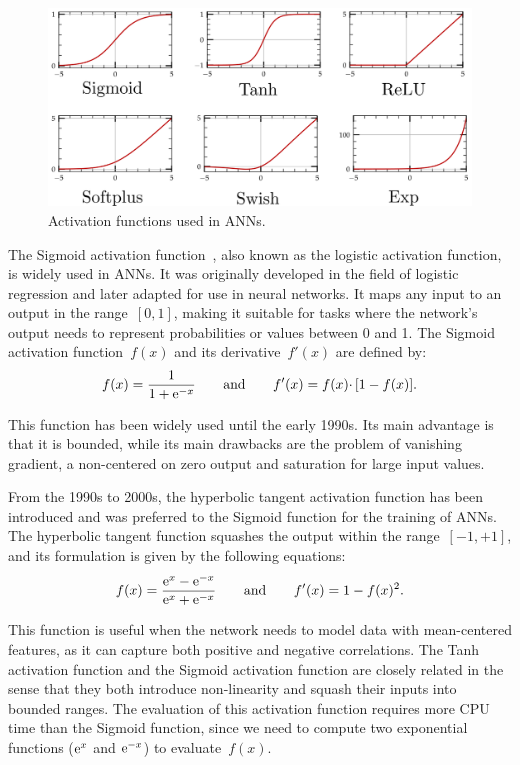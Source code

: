 \documentclass[algorithms,article,accept,pdftex,oneauthor]{Definitions/mdpi}
\DeclareRobustCommand{\e}[1]{{\rm e}^{#1}}
\begin{document}
\begin{figure}[H]
\includegraphics[width=0.8\columnwidth]{Figures/ActFunctions}
\caption{Activation functions used in ANNs.}
\label{fig:ActFunctions}
\end{figure}

The Sigmoid activation function~\cite{Han-1995-ISF}, also known as the logistic activation function, is widely used in ANNs.
It was originally developed in the field of logistic regression and later adapted for use in neural networks.
It maps any input to an output in the range~$[0,1]$, making it suitable for tasks where the network's output needs to represent probabilities or values between 0 and 1.
The Sigmoid activation function~$f(x)$ and its derivative~$f'(x)$ are defined by:
\begin{equation}
f(x) = \frac{1}{1+\e{-x}}\qquad \text{and}\qquad f'(x) = f(x)\cdotp\left[1-f(x)\right].\label{eq:act-sig}
\end{equation}

This function has been widely used until the early 1990s.
Its main advantage is that it is bounded, while its main drawbacks are the problem of vanishing gradient, a non-centered on zero output and saturation for large input values.

From the 1990s to 2000s, the hyperbolic tangent activation function has been introduced and was preferred to the Sigmoid function for the training of ANNs.
The hyperbolic tangent function squashes the output within the range~$[-1,+1]$, and its formulation is given by the following equations:
\begin{equation}
f(x) = \frac{\e{x} - \e{-x}}{\e{x} + \e{-x}}\qquad \text{and}\qquad f'(x) = 1 - f(x)^2.\label{eq:act-tanh}
\end{equation}

This function is useful when the network needs to model data with mean-centered features, as it can capture both positive and negative correlations.
The Tanh activation function and the Sigmoid activation function are closely related in the sense that they both introduce non-linearity and squash their inputs into bounded ranges.
The evaluation of this activation function requires more CPU time than the Sigmoid function, since we need to compute two exponential functions ($\e{x}$ and $\e{-x}$) to evaluate~$f(x)$.
\end{document}
